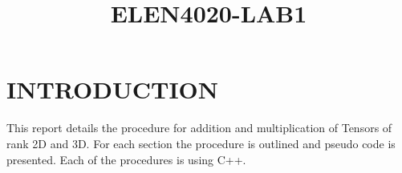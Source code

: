 


\title{\centering \textbf{{ELEN4020-LAB1}}}

\author{}


% 
\abstract{}

\keywords{}


\maketitle
\thispagestyle{empty}\pagestyle{empty}

%

\section{INTRODUCTION} 
This report details the procedure for addition and multiplication of Tensors of rank 2D and 3D. For each section the procedure is outlined and pseudo code is presented. Each of the procedures is  using C++. 

